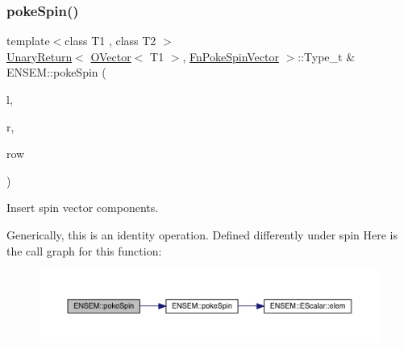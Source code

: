 \subsubsection{\texorpdfstring{pokeSpin()}{pokeSpin()}\hspace{0.1cm}{\footnotesize\ttfamily [1/2]}}
{\footnotesize\ttfamily template$<$class T1 , class T2 $>$ \\
\mbox{\hyperlink{structENSEM_1_1UnaryReturn}{Unary\+Return}}$<$ \mbox{\hyperlink{classENSEM_1_1OVector}{O\+Vector}}$<$ T1 $>$, \mbox{\hyperlink{structENSEM_1_1FnPokeSpinVector}{Fn\+Poke\+Spin\+Vector}} $>$\+::Type\+\_\+t \& E\+N\+S\+E\+M\+::poke\+Spin (\begin{DoxyParamCaption}\item[{\mbox{\hyperlink{classENSEM_1_1OVector}{O\+Vector}}$<$ T1 $>$ \&}]{l,  }\item[{const \mbox{\hyperlink{classENSEM_1_1OVector}{O\+Vector}}$<$ T2 $>$ \&}]{r,  }\item[{int}]{row }\end{DoxyParamCaption})\hspace{0.3cm}{\ttfamily [inline]}}



Insert spin vector components. 

Generically, this is an identity operation. Defined differently under spin Here is the call graph for this function\+:\nopagebreak
\begin{figure}[H]
\begin{center}
\leavevmode
\includegraphics[width=350pt]{da/d59/group__obsvector_gadea0fd5400f7060852f3cd990c3a8ab3_cgraph}
\end{center}
\end{figure}
\mbox{\label{group__obsvector_ga8b52874ec438b5bc2c6faef41097b352}} 
